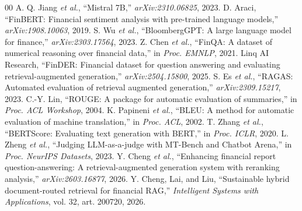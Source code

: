 \documentclass[conference]{IEEEtran}
\begin{document}
\begin{thebibliography}{00}
 A. Q. Jiang \textit{et al.}, ``Mistral 7B,'' \textit{arXiv:2310.06825}, 2023.
 D. Araci, ``FinBERT: Financial sentiment analysis with pre-trained language models,'' \textit{arXiv:1908.10063}, 2019.
 S. Wu \textit{et al.}, ``BloombergGPT: A large language model for finance,'' \textit{arXiv:2303.17564}, 2023.
 Z. Chen \textit{et al.}, ``FinQA: A dataset of numerical reasoning over financial data,'' in \textit{Proc. EMNLP}, 2021.
 Linq AI Research, ``FinDER: Financial dataset for question answering and evaluating retrieval-augmented generation,'' \textit{arXiv:2504.15800}, 2025.
 S. Es \textit{et al.}, ``RAGAS: Automated evaluation of retrieval augmented generation,'' \textit{arXiv:2309.15217}, 2023.
 C.-Y. Lin, ``ROUGE: A package for automatic evaluation of summaries,'' in \textit{Proc. ACL Workshop}, 2004.
 K. Papineni \textit{et al.}, ``BLEU: A method for automatic evaluation of machine translation,'' in \textit{Proc. ACL}, 2002.
 T. Zhang \textit{et al.}, ``BERTScore: Evaluating text generation with BERT,'' in \textit{Proc. ICLR}, 2020.
 L. Zheng \textit{et al.}, ``Judging LLM-as-a-judge with MT-Bench and Chatbot Arena,'' in \textit{Proc. NeurIPS Datasets}, 2023.
 Y. Cheng \textit{et al.}, ``Enhancing financial report question-answering: A retrieval-augmented generation system with reranking analysis,'' \textit{arXiv:2603.16877}, 2026.
 Y. Cheng, Lai, and Liu, ``Sustainable hybrid document-routed retrieval for financial RAG,'' \textit{Intelligent Systems with Applications}, vol. 32, art. 200720, 2026.
\end{thebibliography}
\end{document}
